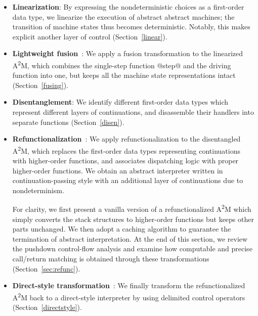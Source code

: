 \documentclass[acmsmall, screen]{acmart}\settopmatter{}
\begin{document}
\begin{itemize}
  \item \textbf{Linearization}: By expressing the
    nondeterministic choices as a first-order data type, we linearize the execution
    of abstract abstract machines; the transition of machine states thus becomes
    deterministic. Notably, this makes explicit another layer of control (Section~\ref{linear}).

  \item \textbf{Lightweight fusion}~\cite{DANVY2008100,Ohori:2007:LFF:1190216.1190241}:
    We apply a fusion transformation to the linearized A\textsuperscript{2}M, which
    combines the single-step function @step@ and the
    driving function into one, but keeps all the machine state representations intact
    (Section~\ref{fusing}).

  \item \textbf{Disentanglement}: We identify
    different first-order data types which represent different layers of continuations, and
    disassemble their handlers into separate functions
    (Section~\ref{disen}).

  \item \textbf{Refunctionalization}~\cite{DANVY2009534,Danvy:2006:RW:2171265.2171268}:
    We apply refunctionalization to the disentangled A\textsuperscript{2}M, which
    replaces the first-order data types representing continuations with
    higher-order functions, and associates dispatching logic with proper higher-order functions.
    We obtain an abstract interpreter written in continuation-passing style with an
    additional layer of continuations due to nondeterminism.

    For clarity, we first present a vanilla version of a refunctionalized A\textsuperscript{2}M which simply
    converts the stack structures to higher-order functions but keeps other parts unchanged.
    We then adopt a caching algorithm \cite{darais2017abstracting} to guarantee the termination
    of abstract interpretation.
    At the end of this section, we review the pushdown control-flow analysis and examine how
    computable and precise call/return matching is obtained through these transformations
    (Section~\ref{sec:refunc}).

  \item \textbf{Direct-style transformation}~\cite{DBLP:journals/scp/Danvy94}:
    We finally transform the refunctionalized A\textsuperscript{2}M back to a
    direct-style interpreter by using delimited control operators
    (Section~\ref{directstyle}).
\end{itemize}
\end{document}
